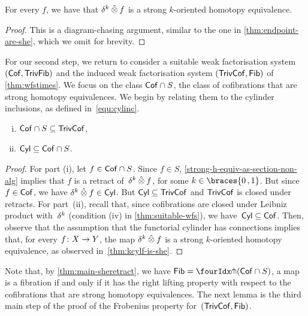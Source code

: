 \documentclass[reqno,10pt,a4paper,oneside,draft]{amsart}
\begin{document}
{{\begin{lemma} \label{thm:kcylf-is-she}
For every $f$, we have that $\delta^k \mathbin{\hat{\otimes}} f$ is a strong $k$-oriented homotopy equivalence. 
\end{lemma} 

\begin{proof} This is a  diagram-chasing argument, similar to the one in \cref{thm:endpoint-are-she}, which we omit for brevity.
\end{proof} 

For our second step, we return to consider a suitable weak factorisation system $(\mathsf{Cof}, \mathsf{TrivFib})$ and the induced weak factorisation system
$(\mathsf{TrivCof}, \mathsf{Fib})$ of  \cref{thm:wfstimes}. We focus on the class $\mathsf{Cof} \cap S$, \ie the class of cofibrations that are strong homotopy equivalences. We begin by relating them to the cylinder inclusions, as defined in~\eqref{equ:cylinc}.

\begin{lemma}  \label{thm:main-sheretract} \hfill 
\begin{enumerate}[(i)] 
\item $\mathsf{Cof} \cap S \subseteq \mathsf{TrivCof}$,
\item $\mathsf{Cyl} \subseteq \mathsf{Cof} \cap S$. 
\end{enumerate}
\end{lemma}

\begin{proof} For part (i), let $f \in  \mathsf{Cof} \cap S$. Since $f \in S$, \cref{strong-h-equiv-as-section-non-alg} implies that $f$ is a retract of~$\delta^k \mathbin{\hat{\otimes}} f$, for some $k \in \braces{0 \, , 1 }$. But since $f \in \mathsf{Cof}$, we have $\delta^k \mathbin{\hat{\otimes}} f \in \mathsf{Cyl}$. But $\mathsf{Cyl} \subseteq \mathsf{TrivCof}$ and $\mathsf{TrivCof}$ is closed under retracts. For part~(ii), recall 
that, since cofibrations are closed under Leibniz product with~$\delta^k$ (condition (iv) in \cref{thm:suitable-wfs}), we have~$\mathsf{Cyl}  \subseteq \mathsf{Cof}$.
Then, observe that the assumption that the functorial cylinder has connections implies that, 
for every $f \colon X \to Y$, the map $\delta^k \mathbin{\hat{\otimes}} f$ is a strong $k$-oriented homotopy equivalence, as observed 
in~\cref{thm:kcylf-is-she}.
\end{proof}

\begin{remark} \label{fib-and-she}
Note that, by \cref{thm:main-sheretract}, we have $\Fib = \liftr{(\Cof \cap S)}$, \ie a map is a fibration if and only if it has the right lifting property with respect to the cofibrations that are strong homotopy equivalences. The next lemma is the third main step of the proof of the Frobenius property for~$(\mathsf{TrivCof}, \mathsf{Fib})$. 
\end{remark} 


}}
\end{document}
